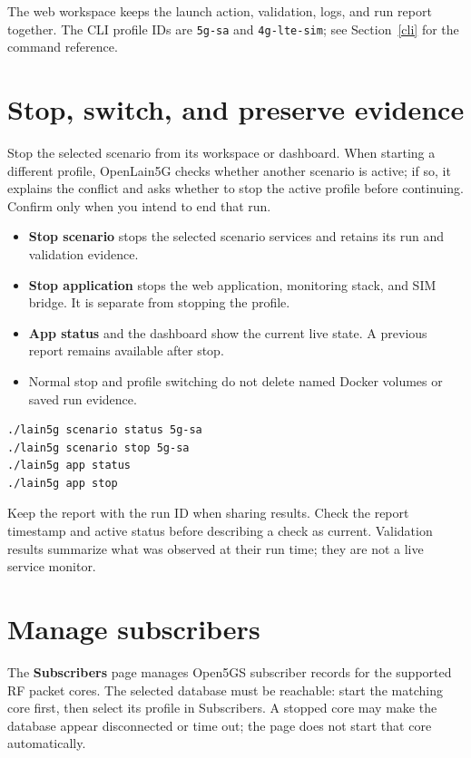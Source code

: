 \documentclass[11pt,a4paper,oneside]{article}
\newcommand{\cmd}[1]{\texttt{\small #1}}
\newcommand{\manualsection}[2]{\clearpage\section{#1}\label{#2}}
\begin{document}
The web workspace keeps the launch action, validation, logs, and run report together. The CLI profile IDs are \cmd{5g-sa} and \cmd{4g-lte-sim}; see Section~\ref{cli} for the command reference.

\manualsection{Stop, switch, and preserve evidence}{lifecycle}
Stop the selected scenario from its workspace or dashboard. When starting a different profile, OpenLain5G checks whether another scenario is active; if so, it explains the conflict and asks whether to stop the active profile before continuing. Confirm only when you intend to end that run.

\begin{itemize}
  \item \textbf{Stop scenario} stops the selected scenario services and retains its run and validation evidence.
  \item \textbf{Stop application} stops the web application, monitoring stack, and SIM bridge. It is separate from stopping the profile.
  \item \textbf{App status} and the dashboard show the current live state. A previous report remains available after stop.
  \item Normal stop and profile switching do not delete named Docker volumes or saved run evidence.
\end{itemize}

\begin{codebox}
\begin{Verbatim}[fontsize=\small]
./lain5g scenario status 5g-sa
./lain5g scenario stop 5g-sa
./lain5g app status
./lain5g app stop
\end{Verbatim}
\end{codebox}

\begin{infobox}
Keep the report with the run ID when sharing results. Check the report timestamp and active status before describing a check as current. Validation results summarize what was observed at their run time; they are not a live service monitor.
\end{infobox}

\manualsection{Manage subscribers}{subscribers}
The \textbf{Subscribers} page manages Open5GS subscriber records for the supported RF packet cores. The selected database must be reachable: start the matching core first, then select its profile in Subscribers. A stopped core may make the database appear disconnected or time out; the page does not start that core automatically.
\end{document}
